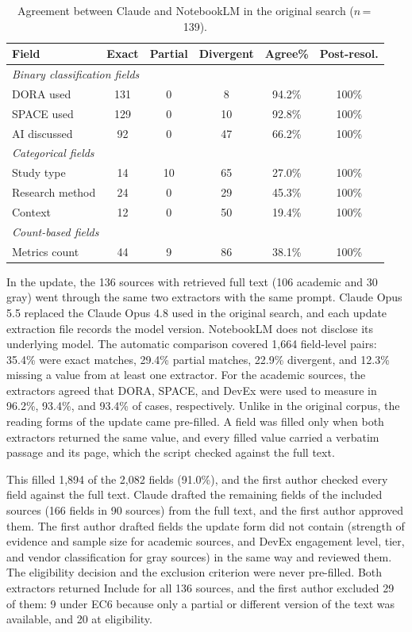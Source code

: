\documentclass[preprint,number]{elsarticle}
\begin{document}
\begin{table}[htbp]
\centering
\caption{Agreement between Claude and NotebookLM in the original search ($n$\,=\,139).}
\label{tab:concordance}
\footnotesize
\begin{tabular}{l c c c c c}
\toprule
\textbf{Field} & \textbf{Exact} & \textbf{Partial} & \textbf{Divergent} & \textbf{Agree\%} & \textbf{Post-resol.} \\
\midrule
\multicolumn{6}{l}{\textit{Binary classification fields}} \\
\quad DORA used     & 131 & 0  & 8   & 94.2\% & 100\% \\
\quad SPACE used    & 129 & 0  & 10  & 92.8\% & 100\% \\
\quad AI discussed  & 92  & 0  & 47  & 66.2\% & 100\% \\
\midrule
\multicolumn{6}{l}{\textit{Categorical fields}} \\
\quad Study type       & 14  & 10 & 65  & 27.0\% & 100\% \\
\quad Research method  & 24  & 0  & 29  & 45.3\% & 100\% \\
\quad Context          & 12  & 0  & 50  & 19.4\% & 100\% \\
\midrule
\multicolumn{6}{l}{\textit{Count-based fields}} \\
\quad Metrics count    & 44  & 9  & 86  & 38.1\% & 100\% \\
\bottomrule
\end{tabular}
\end{table}

In the update, the 136 sources with retrieved full text (106 academic and 30 gray) went through the same two extractors with the same prompt. Claude Opus 5.5 replaced the Claude Opus 4.8 used in the original search, and each update extraction file records the model version. NotebookLM does not disclose its underlying model. The automatic comparison covered 1{,}664 field-level pairs: 35.4\% were exact matches, 29.4\% partial matches, 22.9\% divergent, and 12.3\% missing a value from at least one extractor. For the academic sources, the extractors agreed that DORA, SPACE, and DevEx were used to measure in 96.2\%, 93.4\%, and 93.4\% of cases, respectively. Unlike in the original corpus, the reading forms of the update came pre-filled. A field was filled only when both extractors returned the same value, and every filled value carried a verbatim passage and its page, which the script checked against the full text. 

This filled 1{,}894 of the 2{,}082 fields (91.0\%), and the first author checked every field against the full text. Claude drafted the remaining fields of the included sources (166 fields in 90 sources) from the full text, and the first author approved them. The first author drafted fields the update form did not contain (strength of evidence and sample size for academic sources, and DevEx engagement level, tier, and vendor classification for gray sources) in the same way and reviewed them. The eligibility decision and the exclusion criterion were never pre-filled. Both extractors returned Include for all 136 sources, and the first author excluded 29 of them: 9 under EC6 because only a partial or different version of the text was available, and 20 at eligibility.
\end{document}
